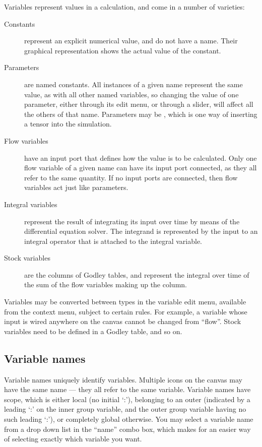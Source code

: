 Variables represent values in a calculation, and come in a number of
varieties:
\begin{description}
\item[Constants] represent an explicit numerical value, and do not
have a name. Their graphical representation shows the actual value of
the constant.
\item[Parameters] are named constants. All instances of a given name
  represent the same value, as with all other named variables, so
  changing the value of one parameter, either through its edit menu,
  or through a slider, will affect all the others of that
  name. Parameters may be , which is one way of inserting a tensor into the
  simulation.
\item[Flow variables] have an input port that defines how the value is
to be calculated. Only one flow variable of a given name can have its
input port connected, as they all refer to the same quantity. If no
input ports are connected, then flow variables act just like
parameters.
\item[Integral variables] represent the result of integrating its
input over time  by means of the differential
equation solver. The integrand is represented by the input to an
integral operator that is attached to the integral variable.
\item[Stock variables] are the columns of Godley tables, and represent
the integral over time of the sum of the flow variables making up the
column.
\end{description}

Variables may be converted between types in the variable edit menu,
available from the context menu, subject to certain rules. For example,
a variable whose input is wired anywhere on the canvas cannot be
changed from ``flow''. Stock variables need to be defined in a Godley
table, and so on.

\subsection{Variable names}

Variable names uniquely identify variables. Multiple icons on the
canvas may have the same name --- they all refer to the same
variable. Variable names have scope, which is either local (no initial
`:'), belonging to an outer  (indicated by a leading `:' on the
inner group variable, and the outer group variable having no such
leading `:'), or completely global otherwise. You may select a
variable name from a drop down list in the ``name'' combo box, which
makes for an easier way of selecting exactly which variable you want.

